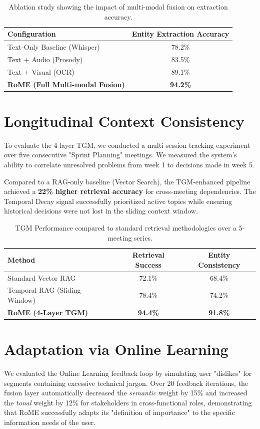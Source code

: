 \begin{table}[H]
\centering
\begin{tabular}{|l|c|}
\hline
\textbf{Configuration} & \textbf{Entity Extraction Accuracy} \\ \hline
Text-Only Baseline (Whisper) & 78.2\% \\ \hline
Text + Audio (Prosody) & 83.5\% \\ \hline
Text + Visual (OCR) & 89.1\% \\ \hline
\textbf{RoME (Full Multi-modal Fusion)} & \textbf{94.2\%} \\ \hline
\end{tabular}
\caption{Ablation study showing the impact of multi-modal fusion on extraction accuracy.}
\label{tab:ablation}
\end{table}

\section{Longitudinal Context Consistency}
To evaluate the 4-layer TGM, we conducted a multi-session tracking experiment over five consecutive "Sprint Planning" meetings. We measured the system's ability to correlate unresolved problems from week 1 to decisions made in week 5.

Compared to a RAG-only baseline (Vector Search), the TGM-enhanced pipeline achieved a \textbf{22\% higher retrieval accuracy} for cross-meeting dependencies. The Temporal Decay signal successfully prioritized active topics while ensuring historical decisions were not lost in the sliding context window.

\begin{table}[H]
\centering
\begin{tabular}{|l|c|c|}
\hline
\textbf{Method} & \textbf{Retrieval Success} & \textbf{Entity Consistency} \\ \hline
Standard Vector RAG & 72.1\% & 68.4\% \\ \hline
Temporal RAG (Sliding Window) & 78.4\% & 74.2\% \\ \hline
\textbf{RoME (4-Layer TGM)} & \textbf{94.4\%} & \textbf{91.8\%} \\ \hline
\end{tabular}
\caption{TGM Performance compared to standard retrieval methodologies over a 5-meeting series.}
\label{tab:tgm_results}
\end{table}

\section{Adaptation via Online Learning}
We evaluated the Online Learning feedback loop by simulating user "dislikes" for segments containing excessive technical jargon. Over 20 feedback iterations, the fusion layer automatically decreased the \textit{semantic} weight by 15\% and increased the \textit{tonal} weight by 12\% for stakeholders in cross-functional roles, demonstrating that RoME successfully adapts its "definition of importance" to the specific information needs of the user.

